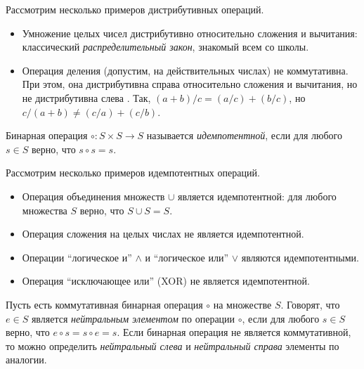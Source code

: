 \begin{example}
    Рассмотрим несколько примеров дистрибутивных операций.
    \begin{itemize}
        \item Умножение целых чисел дистрибутивно относительно сложения и вычитания: классический \emph{распределительный закон}, знакомый всем со школы.
        \item Операция деления (допустим, на действительных числах) не коммутативна.
              При этом, она дистрибутивна справа относительно сложения и вычитания, но не дистрибутивна слева%
              .
              Так, $(a + b) / c = (a / c) + (b / c)$, но $c / (a + b) \neq (c / a) + (c / b)$.
    \end{itemize}
\end{example}

\begin{definition}
    Бинарная операция $\circ: S \times S \to S$ называется \emph{идемпотентной}, если для любого $s \in S$ верно, что $s \circ s = s$.
\end{definition}

\begin{example}
    Рассмотрим несколько примеров идемпотентных операций.
    \begin{itemize}
        \item Операция объединения множеств $\cup$ является идемпотентной: для любого множества $S$ верно, что $S \cup S = S$.
        \item Операция сложения на целых числах не является идемпотентной.
        \item Операции \enquote{логическое и} $\land$ и \enquote{логическое или} $\lor$ являются идемпотентными.
        \item Операция \enquote{исключающее или} (\textsf{XOR}) не является идемпотентной.
    \end{itemize}
\end{example}

\begin{definition}
    Пусть есть коммутативная бинарная операция $\circ$ на множестве $S$.
    Говорят, что $e \in S$ является \emph{нейтральным элементом} по операции $\circ$, если для любого $s \in S$ верно, что $e \circ s = s \circ e = s$.
    Если бинарная операция не является коммутативной, то можно определить \emph{нейтральный слева} и \emph{нейтральный справа} элементы по аналогии.
\end{definition}

